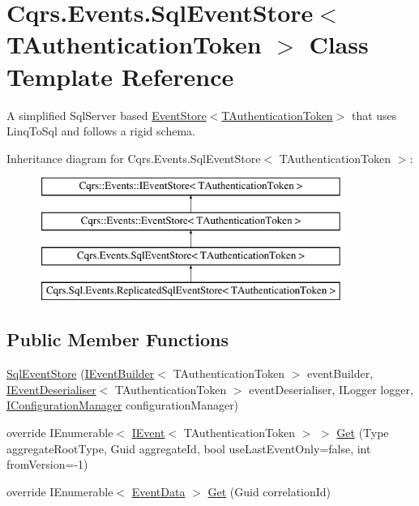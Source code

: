 \hypertarget{classCqrs_1_1Events_1_1SqlEventStore}{}\section{Cqrs.\+Events.\+Sql\+Event\+Store$<$ T\+Authentication\+Token $>$ Class Template Reference}
\label{classCqrs_1_1Events_1_1SqlEventStore}


A simplified Sql\+Server based \hyperlink{classCqrs_1_1Events_1_1EventStore_a6346cb2aea4c5b4e740dc6cfb15abab8_a6346cb2aea4c5b4e740dc6cfb15abab8}{Event\+Store$<$\+T\+Authentication\+Token$>$} that uses Linq\+To\+Sql and follows a rigid schema.  


Inheritance diagram for Cqrs.\+Events.\+Sql\+Event\+Store$<$ T\+Authentication\+Token $>$\+:\begin{figure}[H]
\begin{center}
\leavevmode
\includegraphics[height=4.000000cm]{classCqrs_1_1Events_1_1SqlEventStore}
\end{center}
\end{figure}
\subsection*{Public Member Functions}
\begin{DoxyCompactItemize}
\item 
\hyperlink{classCqrs_1_1Events_1_1SqlEventStore_a15df78a1b12d2e3035b9715e9bfc8535_a15df78a1b12d2e3035b9715e9bfc8535}{Sql\+Event\+Store} (\hyperlink{interfaceCqrs_1_1Events_1_1IEventBuilder}{I\+Event\+Builder}$<$ T\+Authentication\+Token $>$ event\+Builder, \hyperlink{interfaceCqrs_1_1Events_1_1IEventDeserialiser}{I\+Event\+Deserialiser}$<$ T\+Authentication\+Token $>$ event\+Deserialiser, I\+Logger logger, \hyperlink{interfaceCqrs_1_1Configuration_1_1IConfigurationManager}{I\+Configuration\+Manager} configuration\+Manager)
\item 
override I\+Enumerable$<$ \hyperlink{interfaceCqrs_1_1Events_1_1IEvent}{I\+Event}$<$ T\+Authentication\+Token $>$ $>$ \hyperlink{classCqrs_1_1Events_1_1SqlEventStore_a7e32a08a015642a5bc1cefa6998e6f11_a7e32a08a015642a5bc1cefa6998e6f11}{Get} (Type aggregate\+Root\+Type, Guid aggregate\+Id, bool use\+Last\+Event\+Only=false, int from\+Version=-\/1)
\item 
override I\+Enumerable$<$ \hyperlink{classCqrs_1_1Events_1_1EventData}{Event\+Data} $>$ \hyperlink{classCqrs_1_1Events_1_1SqlEventStore_ac1fb2bdec07cbeec57fb3d985e7a8b31_ac1fb2bdec07cbeec57fb3d985e7a8b31}{Get} (Guid correlation\+Id)
\end{DoxyCompactItemize}
